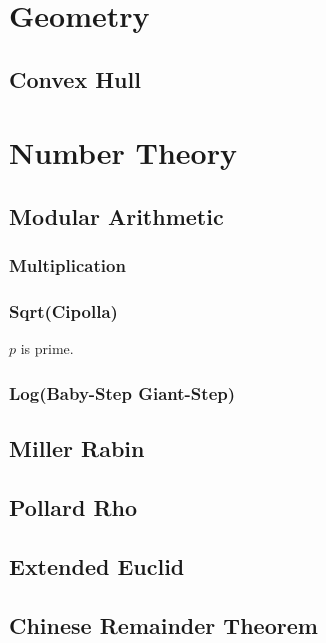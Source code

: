 \documentclass{article}
\begin{document}
\section{Geometry}
    \subsection{Convex Hull}
        
\section{Number Theory}
    \subsection{Modular Arithmetic}
        \subsubsection{Multiplication}
            
        \subsubsection{Sqrt(Cipolla)}
            $p$ is prime.
            
        \subsubsection{Log(Baby-Step Giant-Step)}
            
    \subsection{Miller Rabin}
        
    \subsection{Pollard Rho}
        
    \subsection{Extended Euclid}
        
    \subsection{Chinese Remainder Theorem}
        
\end{document}
